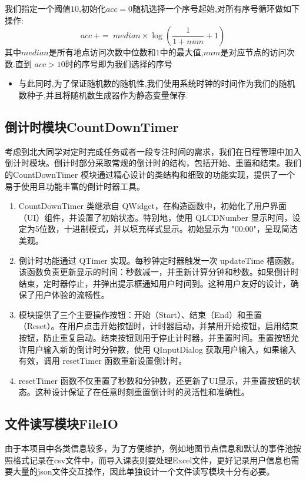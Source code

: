 \documentclass[11pt,hyperref,a4paper,UTF8]{ctexart}
\newcommand{\parameter}[1]{\left(#1\right)}
\begin{document}
\begin{CJK}{UTF8}{gkai}
\begin{enumerate}
    我们指定一个阈值$10$,初始化$acc = 0$随机选择一个序号起始,对所有序号循环做如下操作:
    \[acc~ += ~median \times \log\parameter{\frac{1}{1 + num} + 1}\]
    其中$median$是所有地点访问次数中位数和$1$中的最大值,$num$是对应节点的访问次数.直到 $acc > 10$时的序号即为我们选择的序号
\end{enumerate}

\begin{itemize}
    \item 与此同时,为了保证随机数的随机性,我们使用系统时钟的时间作为我们的随机数种子,并且将随机数生成器作为静态变量保存.
\end{itemize}
\subsection{倒计时模块CountDownTimer}
考虑到北大同学对定时完成任务或者一段专注时间的需求，我们在日程管理中加入倒计时模块。倒计时部分采取常规的倒计时的结构，包括开始、重置和结束。我们的CountDownTimer 模块通过精心设计的类结构和细致的功能实现，提供了一个易于使用且功能丰富的倒计时器工具。
\begin{enumerate}
    \item CountDownTimer 类继承自 QWidget，在构造函数中，初始化了用户界面（UI）组件，并设置了初始状态。特别地，使用 QLCDNumber 显示时间，设定为5位数，十进制模式，并以填充样式显示。初始显示为 "00:00"，呈现简洁美观。
    \item 倒计时功能通过 QTimer 实现。每秒钟定时器触发一次 updateTime 槽函数。该函数负责更新显示的时间：秒数减一，并重新计算分钟和秒数。如果倒计时结束，定时器停止，并弹出提示框通知用户时间到。这种用户友好的设计，确保了用户体验的流畅性。
    \item 模块提供了三个主要操作按钮：开始（Start）、结束（End）和重置（Reset）。在用户点击开始按钮时，计时器启动，并禁用开始按钮，启用结束按钮，防止重复启动。结束按钮则用于停止计时器，并重置时间。重置按钮允许用户输入新的倒计时分钟数，使用 QInputDialog 获取用户输入，如果输入有效，调用 resetTimer 函数重新设置倒计时。
    \item resetTimer 函数不仅重置了秒数和分钟数，还更新了UI显示，并重置按钮的状态。这种设计保证了在任意时刻重置倒计时的灵活性和准确性。
\end{enumerate}

\subsection{文件读写模块FileIO}
由于本项目中各类信息较多，为了方便维护，例如地图节点信息和默认的事件池按照格式记录在csv文件中，而导入课表则要处理Excel文件，更好记录用户信息也需要大量的json文件交互操作，因此单独设计一个文件读写模块十分有必要。


\end{CJK}
\end{document}
